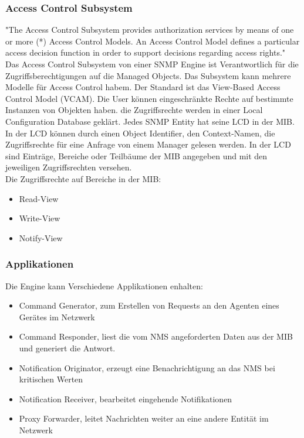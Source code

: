 \documentclass[11pt,a4paper]{article}
\begin{document}
\subsubsection{Access Control Subsystem}
"The Access Control Subsystem provides authorization services by means of one or more (*) Access Control Models. An Access Control Model defines a particular access decision function in order to support decisions regarding access rights."
\cite{rfcSnmpv3EngineACS} \\
Das Access Control Subsystem von einer SNMP Engine ist Verantwortlich für die Zugriffsberechtigungen auf die Managed Objects. Das Subsystem kann mehrere Modelle für Access Control habem. Der Standard ist das View-Based Access Control Model (VCAM). Die User können eingeschränkte Rechte auf bestimmte Instanzen von Objekten haben. die Zugriffsrechte werden in einer Local Configuration Database geklärt. Jedes SNMP Entity hat seine LCD in der MIB. In der LCD können durch einen Object Identifier, den Context-Namen, die Zugriffsrechte für eine Anfrage von einem Manager gelesen werden. In der LCD sind Einträge, Bereiche oder Teilbäume der MIB angegeben und mit den jeweiligen Zugriffsrechten versehen.\\
Die Zugriffsrechte auf Bereiche in der MIB:
\begin{itemize}
	\item Read-View
	\item Write-View
	\item Notify-View
\end{itemize}

\subsubsection{Applikationen}
Die Engine kann Verschiedene Applikationen enhalten:
\begin{itemize}
	\item Command Generator, zum Erstellen von Requests an den Agenten eines Gerätes im Netzwerk
	\item Command Responder, liest die vom NMS angeforderten Daten aus der MIB und generiert die Antwort.
	\item Notification Originator, erzeugt eine Benachrichtigung an das NMS bei kritischen Werten
	\item Notification Receiver, bearbeitet eingehende Notifikationen
	\item Proxy Forwarder, leitet Nachrichten weiter an eine andere Entität im Netzwerk
\end{itemize}
\end{document}
